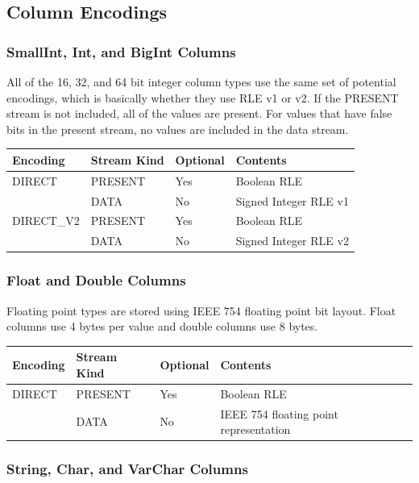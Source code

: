 \documentclass{article}
\begin{document}
\subsection{Column Encodings}

\subsubsection{SmallInt, Int, and BigInt Columns}

All of the 16, 32, and 64 bit integer column types use the same set of
potential encodings, which is basically whether they use RLE v1 or
v2. If the PRESENT stream is not included, all of the values are
present. For values that have false bits in the present stream, no
values are included in the data stream.

\vspace{10pt}
\begin{tabular}{| l | l | l | l |}
\hline
Encoding & Stream Kind & Optional & Contents \\
\hline
DIRECT & PRESENT & Yes & Boolean RLE\\
       & DATA    & No  & Signed Integer RLE v1\\
\hline
DIRECT\_V2 & PRESENT & Yes & Boolean RLE\\
          & DATA    & No  & Signed Integer RLE v2\\
\hline
\end{tabular}

\subsubsection{Float and Double Columns}

Floating point types are stored using IEEE 754 floating point bit
layout. Float columns use 4 bytes per value and double columns use 8
bytes.

\vspace{10pt}
\begin{tabular}{| l | l | l | l |}
\hline
Encoding & Stream Kind & Optional & Contents \\
\hline
DIRECT & PRESENT & Yes & Boolean RLE\\
       & DATA    & No  & IEEE 754 floating point representation\\
\hline
\end{tabular}

\subsubsection{String, Char, and VarChar Columns}
\end{document}
